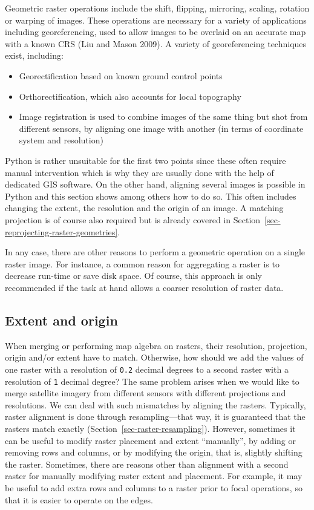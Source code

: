 \documentclass[
  letterpaper,
]{krantz}
\providecommand{\tightlist}{%
  \setlength{\itemsep}{0pt}\setlength{\parskip}{0pt}}\usepackage{longtable,booktabs,array}
\begin{document}
Geometric raster operations include the shift, flipping, mirroring,
scaling, rotation or warping of images. These operations are necessary
for a variety of applications including georeferencing, used to allow
images to be overlaid on an accurate map with a known CRS (Liu and Mason
2009). A variety of georeferencing techniques exist, including:

\begin{itemize}
\tightlist
\item
  Georectification based on known ground control points
\item
  Orthorectification, which also accounts for local topography
\item
  Image registration is used to combine images of the same thing but
  shot from different sensors, by aligning one image with another (in
  terms of coordinate system and resolution)
\end{itemize}

Python is rather unsuitable for the first two points since these often
require manual intervention which is why they are usually done with the
help of dedicated GIS software. On the other hand, aligning several
images is possible in Python and this section shows among others how to
do so. This often includes changing the extent, the resolution and the
origin of an image. A matching projection is of course also required but
is already covered in Section~\ref{sec-reprojecting-raster-geometries}.

In any case, there are other reasons to perform a geometric operation on
a single raster image. For instance, a common reason for aggregating a
raster is to decrease run-time or save disk space. Of course, this
approach is only recommended if the task at hand allows a coarser
resolution of raster data.

\subsection{Extent and origin}\label{sec-extent-and-origin}

When merging or performing map algebra on rasters, their resolution,
projection, origin and/or extent have to match. Otherwise, how should we
add the values of one raster with a resolution of \texttt{0.2} decimal
degrees to a second raster with a resolution of \texttt{1} decimal
degree? The same problem arises when we would like to merge satellite
imagery from different sensors with different projections and
resolutions. We can deal with such mismatches by aligning the rasters.
Typically, raster alignment is done through resampling---that way, it is
guaranteed that the rasters match exactly
(Section~\ref{sec-raster-resampling}). However, sometimes it can be
useful to modify raster placement and extent ``manually'', by adding or
removing rows and columns, or by modifying the origin, that is, slightly
shifting the raster. Sometimes, there are reasons other than alignment
with a second raster for manually modifying raster extent and placement.
For example, it may be useful to add extra rows and columns to a raster
prior to focal operations, so that it is easier to operate on the edges.
\end{document}
